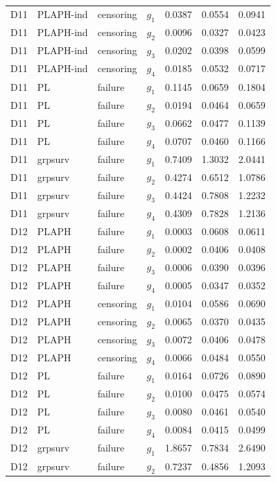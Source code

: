 \begin{longtable}{clllrrr}
D11 & PLAPH-ind & censoring & $g_{1}$ & 0.0387 & 0.0554 & 0.0941 \\
D11 & PLAPH-ind & censoring & $g_{2}$ & 0.0096 & 0.0327 & 0.0423 \\
D11 & PLAPH-ind & censoring & $g_{3}$ & 0.0202 & 0.0398 & 0.0599 \\
D11 & PLAPH-ind & censoring & $g_{4}$ & 0.0185 & 0.0532 & 0.0717 \\
D11 & PL & failure & $g_{1}$ & 0.1145 & 0.0659 & 0.1804 \\
D11 & PL & failure & $g_{2}$ & 0.0194 & 0.0464 & 0.0659 \\
D11 & PL & failure & $g_{3}$ & 0.0662 & 0.0477 & 0.1139 \\
D11 & PL & failure & $g_{4}$ & 0.0707 & 0.0460 & 0.1166 \\
D11 & grpsurv & failure & $g_{1}$ & 0.7409 & 1.3032 & 2.0441 \\
D11 & grpsurv & failure & $g_{2}$ & 0.4274 & 0.6512 & 1.0786 \\
D11 & grpsurv & failure & $g_{3}$ & 0.4424 & 0.7808 & 1.2232 \\
D11 & grpsurv & failure & $g_{4}$ & 0.4309 & 0.7828 & 1.2136 \\
D12 & PLAPH & failure & $g_{1}$ & 0.0003 & 0.0608 & 0.0611 \\
D12 & PLAPH & failure & $g_{2}$ & 0.0002 & 0.0406 & 0.0408 \\
D12 & PLAPH & failure & $g_{3}$ & 0.0006 & 0.0390 & 0.0396 \\
D12 & PLAPH & failure & $g_{4}$ & 0.0005 & 0.0347 & 0.0352 \\
D12 & PLAPH & censoring & $g_{1}$ & 0.0104 & 0.0586 & 0.0690 \\
D12 & PLAPH & censoring & $g_{2}$ & 0.0065 & 0.0370 & 0.0435 \\
D12 & PLAPH & censoring & $g_{3}$ & 0.0072 & 0.0406 & 0.0478 \\
D12 & PLAPH & censoring & $g_{4}$ & 0.0066 & 0.0484 & 0.0550 \\
D12 & PL & failure & $g_{1}$ & 0.0164 & 0.0726 & 0.0890 \\
D12 & PL & failure & $g_{2}$ & 0.0100 & 0.0475 & 0.0574 \\
D12 & PL & failure & $g_{3}$ & 0.0080 & 0.0461 & 0.0540 \\
D12 & PL & failure & $g_{4}$ & 0.0084 & 0.0415 & 0.0499 \\
D12 & grpsurv & failure & $g_{1}$ & 1.8657 & 0.7834 & 2.6490 \\
D12 & grpsurv & failure & $g_{2}$ & 0.7237 & 0.4856 & 1.2093 \\

\end{longtable}
